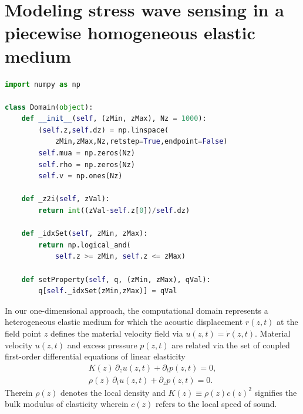 \documentclass[5p,times,twocolumn]{elsarticle}
\begin{document}
\section{Modeling stress wave sensing in a piecewise homogeneous elastic medium}
\label{sec:S2}

\begin{lstlisting}[float,captionpos=b,keywordstyle=\bf, frame=lines, language=Python,basicstyle=\ttfamily\scriptsize, caption={Data structure
for the computational domain in {\tt{python}} module file {\tt{domain.py}}.},
label=code:domain]
import numpy as np

class Domain(object):
    def __init__(self, (zMin, zMax), Nz = 1000):
        (self.z,self.dz) = np.linspace(
            zMin,zMax,Nz,retstep=True,endpoint=False)
        self.mua = np.zeros(Nz)
        self.rho = np.zeros(Nz)
        self.v = np.ones(Nz)

    def _z2i(self, zVal):
        return int((zVal-self.z[0])/self.dz)
    
    def _idxSet(self, zMin, zMax):
        return np.logical_and(
            self.z >= zMin, self.z <= zMax)

    def setProperty(self, q, (zMin, zMax), qVal):
        q[self._idxSet(zMin,zMax)] = qVal
\end{lstlisting}

In our one-dimensional approach, the computational domain represents a
heterogeneous elastic medium for which the acoustic displacement $r(z,t)$ at the
field point $z$ defines the material velocity field via $u(z,t) =\dot{r}(z,t)$.
Material velocity $u(z,t)$ and excess pressure $p(z,t)$ are related via the set
of coupled first-order differential equations of linear elasticity
\cite{Landau:1975,Irgens:2008}
\begin{subequations}
 \begin{align}
    K(z)\,\partial_z u(z,t) + \partial_t p(z,t) = 0, \label{eq:linEl1}\\
    \rho(z)\,\partial_t u(z,t) + \partial_z p(z,t) = 0. \label{eq:linEl2}
  \end{align}
\end{subequations}
Therein $\rho(z)$ denotes the local density and 
$K(z)\equiv \rho(z) c(z)^2$ signifies the bulk modulus of elasticity wherein
$c(z)$ refers to the local speed of sound. 
\end{document}
